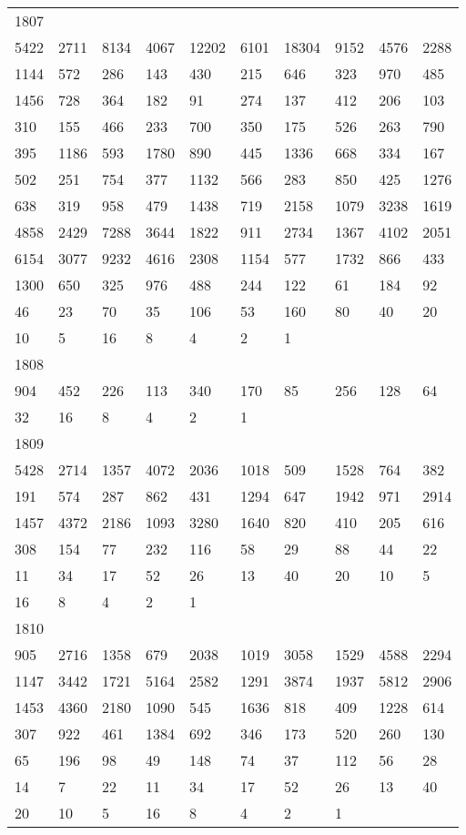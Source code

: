 \begin{longtable}{*{10}{l}}
1807&&&&&&&&&\\
5422& 2711& 8134& 4067& 12202& 6101& 18304& 9152& 4576& 2288\\
1144& 572& 286& 143& 430& 215& 646& 323& 970& 485\\
1456& 728& 364& 182& 91& 274& 137& 412& 206& 103\\
310& 155& 466& 233& 700& 350& 175& 526& 263& 790\\
395& 1186& 593& 1780& 890& 445& 1336& 668& 334& 167\\
502& 251& 754& 377& 1132& 566& 283& 850& 425& 1276\\
638& 319& 958& 479& 1438& 719& 2158& 1079& 3238& 1619\\
4858& 2429& 7288& 3644& 1822& 911& 2734& 1367& 4102& 2051\\
6154& 3077& 9232& 4616& 2308& 1154& 577& 1732& 866& 433\\
1300& 650& 325& 976& 488& 244& 122& 61& 184& 92\\
46& 23& 70& 35& 106& 53& 160& 80& 40& 20\\
10& 5& 16& 8& 4& 2& 1& \\

1808&&&&&&&&&\\
904& 452& 226& 113& 340& 170& 85& 256& 128& 64\\
32& 16& 8& 4& 2& 1& \\

1809&&&&&&&&&\\
5428& 2714& 1357& 4072& 2036& 1018& 509& 1528& 764& 382\\
191& 574& 287& 862& 431& 1294& 647& 1942& 971& 2914\\
1457& 4372& 2186& 1093& 3280& 1640& 820& 410& 205& 616\\
308& 154& 77& 232& 116& 58& 29& 88& 44& 22\\
11& 34& 17& 52& 26& 13& 40& 20& 10& 5\\
16& 8& 4& 2& 1& \\

1810&&&&&&&&&\\
905& 2716& 1358& 679& 2038& 1019& 3058& 1529& 4588& 2294\\
1147& 3442& 1721& 5164& 2582& 1291& 3874& 1937& 5812& 2906\\
1453& 4360& 2180& 1090& 545& 1636& 818& 409& 1228& 614\\
307& 922& 461& 1384& 692& 346& 173& 520& 260& 130\\
65& 196& 98& 49& 148& 74& 37& 112& 56& 28\\
14& 7& 22& 11& 34& 17& 52& 26& 13& 40\\
20& 10& 5& 16& 8& 4& 2& 1& \\


\end{longtable}
